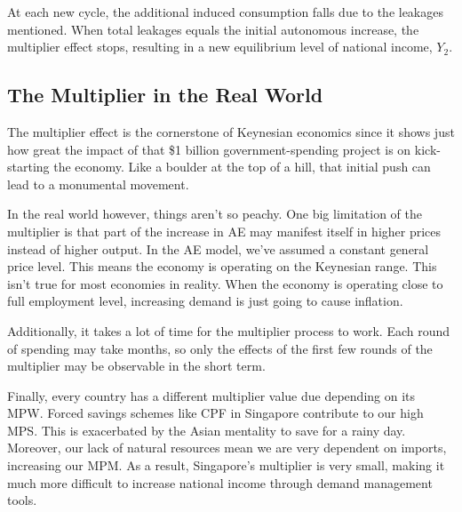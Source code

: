 At each new cycle, the additional induced consumption falls due to the leakages mentioned. When total leakages equals the initial autonomous increase, the multiplier effect stops, resulting in a new equilibrium level of national income, $Y_2$.
\subsection{The Multiplier in the Real World}
The multiplier effect is the cornerstone of Keynesian economics since it shows just how great the impact of that \$1 billion government-spending project is on kick-starting the economy. Like a boulder at the top of a hill, that initial push can lead to a monumental movement. 

In the real world however, things aren’t so peachy. One big limitation of the multiplier is that part of the increase in AE may manifest itself in higher prices instead of higher output. In the AE model, we’ve assumed a constant general price level. This means the economy is operating on the Keynesian range. This isn’t true for most economies in reality. When the economy is operating close to full employment level, increasing demand is just going to cause inflation. 

Additionally, it takes a lot of time for the multiplier process to work. Each round of spending may take months, so only the effects of the first few rounds of the multiplier may be observable in the short term.

Finally, every country has a different multiplier value due depending on its MPW. Forced savings schemes like CPF in Singapore contribute to our high MPS. This is exacerbated by the Asian mentality to save for a rainy day. Moreover, our lack of natural resources mean we are very dependent on imports, increasing our MPM. As a result, Singapore’s multiplier is very small, making it much more difficult to increase national income through demand management tools.

